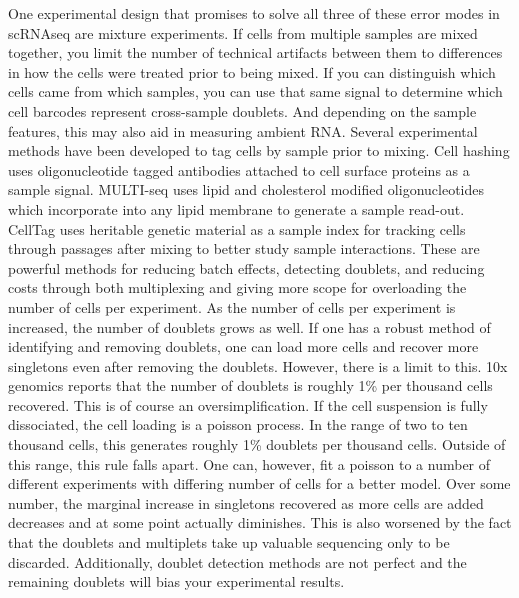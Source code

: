 \par{
One experimental design that promises to solve all three of these error modes in scRNAseq are mixture experiments. If cells from multiple samples are mixed together, you limit the number of technical artifacts between them to differences in how the cells were treated prior to being mixed. If you can distinguish which cells came from which samples, you can use that same signal to determine which cell barcodes represent cross-sample doublets. And depending on the sample features, this may also aid in measuring ambient RNA. Several experimental methods have been developed to tag cells by sample prior to mixing. Cell hashing uses oligonucleotide tagged antibodies attached to cell surface proteins as a sample signal\cite{cellhashing}\cite{nucleimulti}. MULTI-seq uses lipid and cholesterol modified oligonucleotides which incorporate into any lipid membrane to generate a sample read-out\cite{multiseq}. CellTag uses heritable genetic material as a sample index for tracking cells through passages after mixing to better study sample interactions\cite{celltag}. These are powerful methods for reducing batch effects, detecting doublets, and reducing costs through both multiplexing and giving more scope for overloading the number of cells per experiment. As the number of cells per experiment is increased, the number of doublets grows as well. If one has a robust method of identifying and removing doublets, one can load more cells and recover more singletons even after removing the doublets. However, there is a limit to this. 10x genomics reports that the number of doublets is roughly 1\% per thousand cells recovered. This is of course an oversimplification. If the cell suspension is fully dissociated, the cell loading is a poisson process. In the range of two to ten thousand cells, this generates roughly 1\% doublets per thousand cells. Outside of this range, this rule falls apart. One can, however, fit a poisson to a number of different experiments with differing number of cells for a better model. Over some number, the marginal increase in singletons recovered as more cells are added decreases and at some point actually diminishes. This is also worsened by the fact that the doublets and multiplets take up valuable sequencing only to be discarded. Additionally, doublet detection methods are not perfect and the remaining doublets will bias your experimental results. 
} \\

